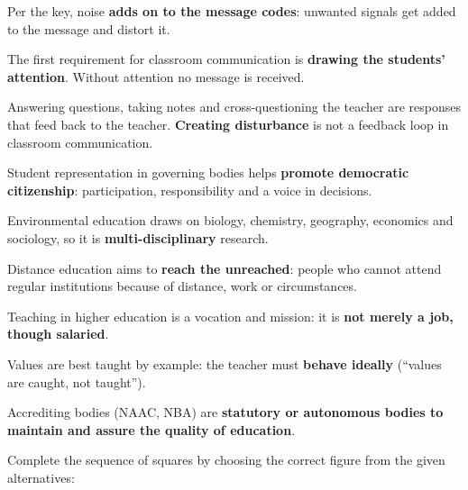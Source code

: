 Per the key, noise \textbf{adds on to the message codes}: unwanted signals get added to the message and distort it.

The first requirement for classroom communication is \textbf{drawing the students' attention}. Without attention no message is received.

Answering questions, taking notes and cross-questioning the teacher are responses that feed back to the teacher. \textbf{Creating disturbance} is not a feedback loop in classroom communication.

Student representation in governing bodies helps \textbf{promote democratic citizenship}: participation, responsibility and a voice in decisions.

Environmental education draws on biology, chemistry, geography, economics and sociology, so it is \textbf{multi-disciplinary} research.

Distance education aims to \textbf{reach the unreached}: people who cannot attend regular institutions because of distance, work or circumstances.

Teaching in higher education is a vocation and mission: it is \textbf{not merely a job, though salaried}.

Values are best taught by example: the teacher must \textbf{behave ideally} (``values are caught, not taught'').

Accrediting bodies (NAAC, NBA) are \textbf{statutory or autonomous bodies to maintain and assure the quality of education}.

Complete the sequence of squares by choosing the correct figure from the given alternatives:\\[3pt]
\centering
\newcommand{\sq}[1]{\framebox[1.1cm][c]{\rule{0pt}{0.8cm}\parbox[c]{1cm}{\centering\tiny #1}}}
\sq{$\angle$}\,\sq{$\triangle\angle$}\,\sq{$\triangle\triangle\triangle$}\,\sq{$\triangle\triangle\triangle$\\$\triangle\angle$}\,\sq{$\triangle\triangle\triangle$\\$\triangle\triangle\triangle$\\$\angle$}\,\sq{?}

\framebox{\parbox{0.9cm}{\centering\tiny$\triangle\triangle\triangle$\\$\triangle\triangle\triangle$\\$\triangle\triangle\triangle$}}
\framebox{\parbox{0.9cm}{\centering\tiny$\triangle\triangle\triangle$\\$\triangle\triangle\triangle$\\$\triangle\triangle\triangle$\\$\triangle\angle$}}
\framebox{\parbox{0.9cm}{\centering\tiny$\triangle\triangle\triangle$\\$\triangle\triangle\triangle$\\$\triangle\triangle\triangle$\\$\triangle\triangle\angle$}}
\framebox{\parbox{0.9cm}{\centering\tiny$\triangle\triangle\triangle$\\$\triangle\triangle\triangle$\\$\triangle\angle\angle$}}

